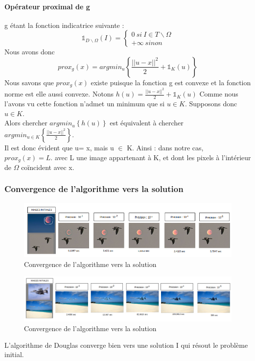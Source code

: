 \paragraph{Opérateur proximal de g}
g étant la fonction indicatrice suivante : 
\begin{equation*}
\mathbb{1}_{ D \backslash \Omega }(I) =
	\left\{
	\begin{aligned}{}
	0 \ si\  I \in T \backslash \Omega \\
	+ \infty \ sinon
    \end{aligned}
    \right.
\end{equation*}{}
Nous avons donc 
\begin{equation*}
prox_g(x) =  argmin_u\left\{\frac{||u-x||^2}{2}+ \mathbb{1}_K(u)\right\}
\end{equation*}
Nous savons que $prox_g(x)$ existe puisque la fonction g est convexe et la fonction norme est elle aussi convexe.\newline
Notons $h(u) = \frac{||u-x||^2}{2}+ \mathbb{1}_K(u)$ 
Comme nous l'avons vu cette fonction n'admet un minimum que si $u \in K$. Supposons donc $u \in K$.\\
 Alors chercher $argmin_u \left\{h(u)\right\}$ est équivalent à chercher $argmin_{u\in K} \left\{\frac{||u-x||^2}{2}\right\}$.\\
Il est donc évident que u= x, mais u $\in $ K. Ainsi : dans notre cas, $prox_g(x) = L$.
avec L une image appartenant à K, et dont les pixels à l'intérieur de $\Omega$ coïncident avec x.\\
\subsubsection{Convergence de l'algorithme vers la solution}
\begin{figure}[!htb]
\includegraphics[scale=0.6]{Images/Resultats/conv1.png}
\caption{Convergence de l'algorithme vers la solution}
\end{figure}
\begin{figure}[!htb]
\includegraphics[scale=0.4]{Images/Resultats/conv2.png}
\caption{Convergence de l'algorithme vers la solution}
\end{figure}
L'algorithme de Douglas converge bien vers une solution I qui résout le problème initial.

